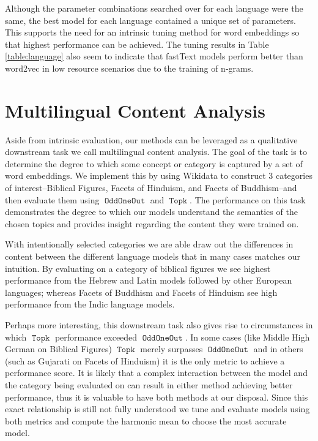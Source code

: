 \documentclass[11pt,a4paper]{article}
\DeclareMathOperator{\OddOneOut}{\texttt{OddOneOut}}
\DeclareMathOperator{\topk}{\texttt{Topk}}
\begin{document}
Although the parameter combinations searched over for each language were the same,
the best model for each language contained a unique set of parameters. 
This supports the need for an intrinsic tuning method for word embeddings so that highest performance can be achieved. 
The tuning results in Table \ref{table:language} also seem to indicate that fastText models perform better than word2vec in low resource scenarios 
 due to the training of n-grams.


\section{Multilingual Content Analysis}
Aside from intrinsic evaluation, our methods can be leveraged as a qualitative downstream task we call multilingual content analysis.
The goal of the task is to determine the degree to which some concept or category is captured by a set of word embeddings. 
We implement this by using Wikidata to construct $3$ categories of interest--Biblical Figures, Facets of Hinduism, and Facets of Buddhism--and then evaluate them using $\OddOneOut$ and $\topk$. 
The performance on this task demonstrates the degree to which our models understand the semantics of the chosen topics 
and provides insight regarding the content they were trained on.

With intentionally selected categories we are able draw out the differences in content between the different language models
that in many cases matches our intuition. 
By evaluating on a category of biblical figures we see highest performance from the Hebrew and Latin models followed by other European languages; 
whereas Facets of Buddhism and Facets of Hinduism see high performance from the Indic language models.

Perhaps more interesting, this downstream task also gives rise to circumstances in which $\topk$ performance exceeded $\OddOneOut$. 
In some cases (like Middle High German on Biblical Figures) $\topk$ merely surpasses $\OddOneOut$ 
and in others (such as Gujarati on Facets of Hinduism) it is the only metric to achieve a performance score. 
It is likely that a complex interaction between the model and the category being evaluated on can result in either method achieving better performance, 
thus it is valuable to have both methods at our disposal. 
Since this exact relationship is still not fully understood we tune and evaluate models using both metrics 
and compute the harmonic mean to choose the most accurate model.
\end{document}
